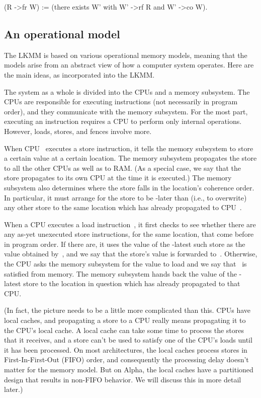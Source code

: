 \begin{VerbatimU}
	(R ->fr W) := (there exists W' with W' ->rf R and W' ->co W).
\end{VerbatimU}


\subsection{An operational model}
\label{sec:docs:explanation:An Operational Model}

The LKMM is based on various operational memory models, meaning that
the models arise from an abstract view of how a computer system
operates.
Here are the main ideas, as incorporated into the LKMM\@.

The system as a whole is divided into the CPUs and a memory subsystem.
The CPUs are responsible for executing instructions (not necessarily
in program order), and they communicate with the memory subsystem.
For the most part, executing an instruction requires a CPU to perform
only internal operations.
However, loads, stores, and fences involve more.

When CPU~ executes a store instruction, it tells the memory subsystem
to store a certain value at a certain location.
The memory subsystem propagates the store to all the other CPUs as well
as to RAM\@.
(As a special case, we say that the store propagates to its own CPU at the
time it is executed.)
The memory subsystem also determines where the store falls in the
location's coherence order.
In particular, it must arrange for the store to be -later than
(i.e., to overwrite) any other store to the same location which has
already propagated to CPU~.

When a CPU executes a load instruction~, it first checks to see
whether there are any as-yet unexecuted store instructions,
for the same location, that come before~ in program order.
If there are, it uses the value of the -latest such store as
the value obtained by~, and we say that the store's value is
forwarded to~.
Otherwise, the CPU asks the memory subsystem for the value to load
and we say that~ is satisfied from memory.
The memory subsystem hands back the value of the -latest store
to the location in question which has already propagated to that CPU\@.

(In fact, the picture needs to be a little more complicated than this.
CPUs have local caches, and propagating a store to a CPU really means
propagating it to the CPU's local cache.
A local cache can take some time to process the stores that it
receives, and a store can't be used to satisfy one of the CPU's loads
until it has been processed.
On most architectures, the local caches process stores in
First-In-First-Out (FIFO) order, and consequently the processing delay
doesn't matter for the memory model.
But on Alpha, the local caches have a partitioned design that results
in non-FIFO behavior.  We will discuss this in more detail later.)

